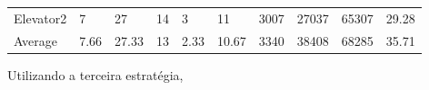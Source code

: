 ﻿\documentclass[a4paper]{article}
\begin{document}
\begin{table}[h]
\begin{tabular}{@{}llllllllll@{}}
Elevator2 & 7        & 27            & 14           & 3                                                               & 11                                                                  & 3007                                                         & 27037                                                 & 65307                                                   & 29.28         \\
Average   & 7.66     & 27.33         & 13        & 2.33                                                               & 10.67 & 3340                                                         & 38408                                                 & 68285                                                   & 35.71          \\ \bottomrule
\end{tabular}
\end{table}

Utilizando a terceira estratégia,
\end{document}

